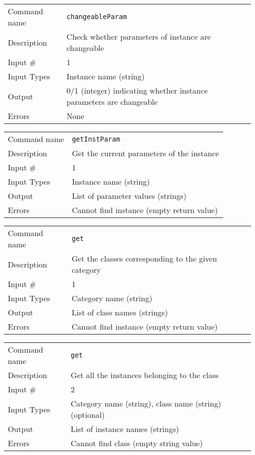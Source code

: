 \bigskip

\noindent
\begin{tabular}{l|p{5in}}
\hline
Command name & {\tt changeableParam} \\
Description  & Check whether parameters of instance are changeable \\
Input \#     & 1 \\
Input Types  & Instance name (string) \\
Output       & 0/1 (integer) indicating whether instance parameters are
               changeable \\
Errors       & None \\
\hline
\end{tabular}

\bigskip

\noindent
\begin{tabular}{l|p{5in}}
\hline
Command name & {\tt getInstParam} \\
Description  & Get the current parameters of the instance \\
Input \#     & 1 \\
Input Types  & Instance name (string) \\
Output       & List of parameter values (strings) \\
Errors       & Cannot find instance (empty return value) \\
\hline
\end{tabular}

\bigskip

\noindent
\begin{tabular}{l|p{5in}}
\hline
Command name & {\tt get} \\
Description  & Get the classes corresponding to the given category \\
Input \#     & 1 \\
Input Types  & Category name (string) \\
Output       & List of class names (strings) \\
Errors       & Cannot find instance (empty return value) \\
\hline
\end{tabular}

\bigskip

\noindent
\begin{tabular}{l|p{5in}}
\hline
Command name & {\tt get} \\
Description  & Get all the instances belonging to the class \\
Input \#     & 2 \\
Input Types  & Category name (string), class name (string) (optional) \\
Output       & List of instance names (strings) \\
Errors       & Cannot find class (empty string value) \\
\hline
\end{tabular}


